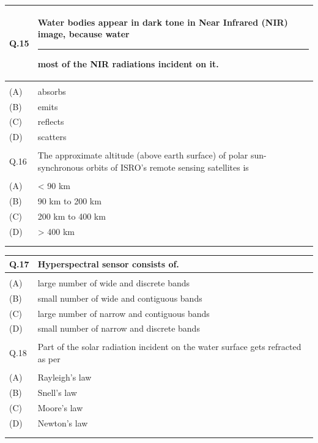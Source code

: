 \documentclass[12pt]{article}
\begin{document}
\begin{table}[H]
\renewcommand{\arraystretch}{3}
\setlength{\tabcolsep}{8pt}
\begin{tabular}{|l|p{15cm}|}
\hline

Q.15 &Water bodies appear in dark tone in Near Infrared (NIR) image, because water
\rule{2cm}{0.15mm} most of the NIR radiations incident on it.\\ \hline 
 & \\ \hline
(A)&absorbs\\ \hline
(B)&emits \\ \hline
(C)&reflects\\ \hline
(D)&scatters \\ \hline
 & \\ \hline

Q.16 & The approximate altitude (above earth surface) of polar sun-synchronous orbits of
ISRO’s remote sensing satellites is\\ \hline
 & \\ \hline
(A)&< 90 km\\ \hline
(B)&90 km to 200 km\\ \hline
(C)&200 km to 400 km \\ \hline
(D)& > 400 km\\ \hline
 & \\ \hline
 & \\ \hline

\end{tabular}
\end{table}

\begin{table}[H]
\renewcommand{\arraystretch}{3}
\setlength{\tabcolsep}{8pt}
\begin{tabular}{|l|p{15cm}|}
\hline

Q.17 &Hyperspectral sensor consists of.\\ \hline 
 & \\ \hline
(A)&large number of wide and discrete bands\\ \hline
(B)&small number of wide and contiguous bands \\ \hline
(C)&large number of narrow and contiguous bands\\ \hline
(D)&small number of narrow and discrete bands \\ \hline
 & \\ \hline

Q.18 & Part of the solar radiation incident on the water surface gets refracted as per\\ \hline
 & \\ \hline
(A)&Rayleigh’s law\\ \hline
(B)&Snell’s law\\ \hline
(C)&Moore’s law \\ \hline
(D)&Newton’s law\\ \hline
 & \\ 
 & \\ \hline

 

\end{tabular}
\end{table}
\end{document}
